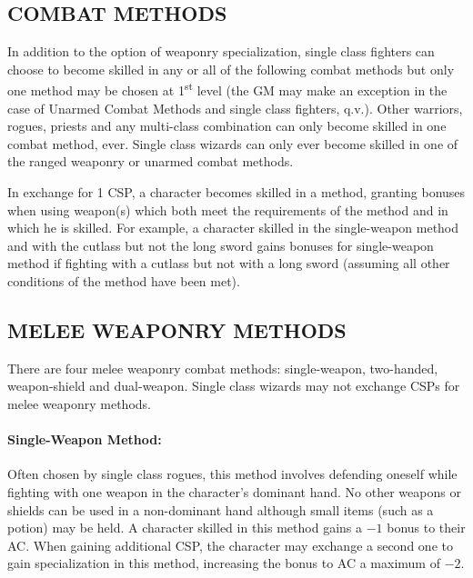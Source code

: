 \begin{multicols}{2}
\section{COMBAT METHODS}

In addition to the option of weaponry specialization, single class fighters can choose to become skilled in any or all of the following combat methods but only one method may be chosen at 1\textsuperscript{st} level (the GM may make an exception in the case of Unarmed Combat Methods and single class fighters, q.v.).  Other warriors, rogues, priests and any multi-class combination can only become skilled in one combat method, ever.  Single class wizards can only ever become skilled in one of the ranged weaponry or unarmed combat methods.

In exchange for 1 CSP, a character becomes skilled in a method, granting bonuses when using weapon(s) which both meet the requirements of the method and in which he is skilled.  For example, a character skilled in the single-weapon method and with the cutlass but not the long sword gains bonuses for single-weapon method if fighting with a cutlass but not with a long sword (assuming all other conditions of the method have been met).

\subsection{MELEE WEAPONRY METHODS}

There are four melee weaponry combat methods: single-weapon, two-handed, weapon-shield and dual-weapon.  Single class wizards may not exchange CSPs for melee weaponry methods.

\paragraph{Single-Weapon Method:} Often chosen by single class rogues, this method involves defending oneself while fighting with one weapon in the character's dominant hand.  No other weapons or shields can be used in a non-dominant hand although small items (such as a potion) may be held.  A character skilled in this method gains a $-1$ bonus to their AC.  When gaining additional CSP, the character may exchange a second one to gain specialization in this method, increasing the bonus to AC a maximum of $-2$.


\end{multicols}

